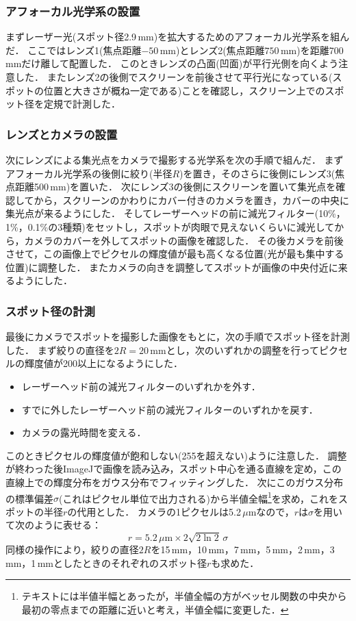 \documentclass[titlepage]{jsarticle}
\begin{document}
\subsubsection{アフォーカル光学系の設置}
まずレーザー光(スポット径2.9\,mm)を拡大するためのアフォーカル光学系を組んだ．
ここではレンズ1(焦点距離$-50$\,mm)とレンズ2(焦点距離$750$\,mm)を距離700\,mmだけ離して配置した．
このときレンズの凸面(凹面)が平行光側を向くよう注意した．
またレンズ2の後側でスクリーンを前後させて平行光になっている(スポットの位置と大きさが概ね一定である)ことを確認し，スクリーン上でのスポット径を定規で計測した．

\subsubsection{レンズとカメラの設置}
次にレンズによる集光点をカメラで撮影する光学系を次の手順で組んだ．
まずアフォーカル光学系の後側に絞り(半径$R$)を置き，そのさらに後側にレンズ3(焦点距離500\,mm)を置いた．
次にレンズ3の後側にスクリーンを置いて集光点を確認してから，スクリーンのかわりにカバー付きのカメラを置き，カバーの中央に集光点が来るようにした．
そしてレーザーヘッドの前に減光フィルター(10\%，1\%，0.1\%の3種類)をセットし，スポットが肉眼で見えないくらいに減光してから，カメラのカバーを外してスポットの画像を確認した．
その後カメラを前後させて，この画像上でピクセルの輝度値が最も高くなる位置(光が最も集中する位置)に調整した．
またカメラの向きを調整してスポットが画像の中央付近に来るようにした．

\subsubsection{スポット径の計測}
最後にカメラでスポットを撮影した画像をもとに，次の手順でスポット径を計測した．
まず絞りの直径を$2R=20$\,mmとし，次のいずれかの調整を行ってピクセルの輝度値が200以上になるようにした．
\begin{itemize}
    \item レーザーヘッド前の減光フィルターのいずれかを外す．
    \item すでに外したレーザーヘッド前の減光フィルターのいずれかを戻す．
    \item カメラの露光時間を変える．
\end{itemize}
このときピクセルの輝度値が飽和しない(255を超えない)ように注意した．
調整が終わった後ImageJで画像を読み込み，スポット中心を通る直線を定め，この直線上での輝度分布をガウス分布でフィッティングした．
次にこのガウス分布の標準偏差$\sigma$(これはピクセル単位で出力される)から半値全幅\footnote{テキストには半値半幅とあったが，半値全幅の方がベッセル関数の中央から最初の零点までの距離に近いと考え，半値全幅に変更した．}を求め，これをスポットの半径$r$の代用とした．
カメラの1ピクセルは5.2\,$\mu$mなので，$r$は$\sigma$を用いて次のように表せる：
\begin{equation}
    r = 5.2\,\mu\mathrm{m}\times2\sqrt{2\ln{2}}\,\sigma
\end{equation}
同様の操作により，絞りの直径$2R$を15\,mm，10\,mm，7\,mm，5\,mm，2\,mm，3\,mm，1\,mmとしたときのそれぞれのスポット径$r$も求めた．
\end{document}
